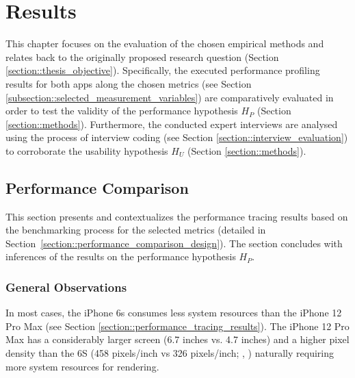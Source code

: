 
\chapter{Results} \label{chapter::results}
This chapter focuses on the evaluation of the chosen empirical methods and relates back to the originally proposed research question (Section \ref{section::thesis_objective}).
Specifically, the executed performance profiling results for both apps
along the chosen metrics (see Section \ref{subsection::selected_measurement_variables}) are comparatively evaluated in order to test the validity of the performance hypothesis $H_P$ (Section \ref{section::methods}).
Furthermore, the conducted expert interviews are analysed using the process of interview coding (see Section \ref{section::interview_evaluation}) to corroborate the usability hypothesis $H_U$ (Section \ref{section::methods}).

\section{Performance Comparison} \label{section::performance_comparison}
This section presents and contextualizes the performance tracing results based on the benchmarking process for the selected metrics (detailed in Section \ref{section::performance_comparison_design}).
The section concludes with inferences of the results on the performance hypothesis $H_P$.

\subsection{General Observations}
In most cases, the iPhone 6s consumes less system resources than the iPhone 12 Pro Max (see Section \ref{section::performance_tracing_results}).
The iPhone 12 Pro Max has a considerably larger screen (6.7 inches vs. 4.7 inches) and a higher pixel density than the 6S (458 pixels/inch vs 326 pixels/inch; \cite{Apple2021d}, \cite{Apple2021c}) naturally requiring more system resources for rendering.


